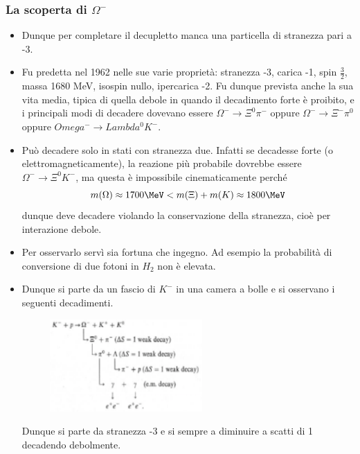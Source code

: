 \subsubsection{La scoperta di $\Omega^-$}
\begin{itemize}
\item Dunque per completare il decupletto manca una particella di stranezza pari a -3.
\item Fu predetta nel 1962 nelle sue varie proprietà: stranezza -3, carica -1, spin $\frac32$, massa 1680 MeV, isospin nullo, ipercarica -2. Fu dunque prevista anche la sua vita media, tipica di quella debole in quando il decadimento forte è proibito, e i principali modi di decadere dovevano essere $\Omega^-\to\Xi^0\pi^-$ oppure $\Omega^-\to\Xi^-\pi^0$ oppure $Omega^-\to Lambda^0K^-$.
\item Può decadere solo in stati con stranezza due. Infatti se decadesse forte (o elettromagneticamente), la reazione più probabile dovrebbe essere $\Omega^-\to\Xi^0K^-$, ma questa è impossibile cinematicamente perché 
\begin{equation*}
m(\Omega)\approx1700\MeV<m(\Xi)+m(K)\approx1800\MeV
\end{equation*}
dunque deve decadere violando la conservazione della stranezza, cioè per interazione debole.
\item Per osservarlo servì sia fortuna che ingegno. Ad esempio la probabilità di conversione di due fotoni in $H_2$ non è elevata. 
\item Dunque si parte da un fascio di $K^-$ in una camera a bolle e si osservano i seguenti decadimenti.
\begin{figure}[H]
    \centering
    \includegraphics[width=0.55\textwidth]{immagini/fig_omega_meno.png}
  \end{figure}
  Dunque si parte da stranezza -3 e si sempre a diminuire a scatti di 1 decadendo debolmente.
\end{itemize}
